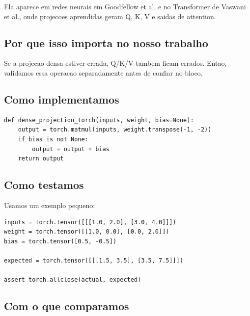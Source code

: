 Ela aparece em redes neurais em Goodfellow et al. e no Transformer de Vaswani et al., onde projecoes aprendidas geram Q, K, V e saidas de attention.



\subsection{Por que isso importa no nosso trabalho}




Se a projecao densa estiver errada, Q/K/V tambem ficam errados. Entao, validamos essa operacao separadamente antes de confiar no bloco.



\subsection{Como implementamos}



\begin{Verbatim}[fontsize=\small,breaklines=true,label=python]
def dense_projection_torch(inputs, weight, bias=None):
    output = torch.matmul(inputs, weight.transpose(-1, -2))
    if bias is not None:
        output = output + bias
    return output
\end{Verbatim}



\subsection{Como testamos}



Usamos um exemplo pequeno:



\begin{Verbatim}[fontsize=\small,breaklines=true,label=python]
inputs = torch.tensor([[[1.0, 2.0], [3.0, 4.0]]])
weight = torch.tensor([[1.0, 0.0], [0.0, 2.0]])
bias = torch.tensor([0.5, -0.5])

expected = torch.tensor([[[1.5, 3.5], [3.5, 7.5]]])

assert torch.allclose(actual, expected)
\end{Verbatim}



\subsection{Com o que comparamos}



